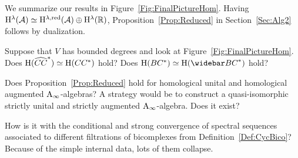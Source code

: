 \documentclass[\MainFolder/Text.tex]{subfiles}
\begin{document}
We summarize our results in Figure~\ref{Fig:FinalPictureHom}. Having $\mathrm{H}^\lambda(\mathcal{A}) \simeq \mathrm{H}^{\lambda,\mathrm{red}}(\mathcal{A}) \oplus \mathrm{H}^{\lambda}(\mathbb{R})$, Proposition~\ref{Prop:Reduced} in Section~\ref{Sec:Alg2} follows by dualization. 

\begin{Remark}\label{Rem:OpenProbAInftx}
\begin{RemarkList}
\item Suppose that $V$ has bounded degrees and look at Figure~\ref{Fig:FinalPictureHom}. Does $\mathrm{H}(\widehat{CC}^*)\simeq \mathrm{H}(CC^*)$ hold? Does $\H(\ConCycBi^*)\simeq\H(\NConCycBi^*)$ hold?
\item Does Proposition~\ref{Prop:Reduced} hold for homological unital and homological augmented $\mathrm{A}_\infty$-algebras? A strategy would be to construct a quasi-isomorphic strictly unital and strictly augmented $\mathrm{A}_\infty$-algebra. Does it exist?
\item How is it with the conditional and strong convergence of spectral sequences associated to different filtrations of bicomplexes from Definition~\ref{Def:CycBico}? Because of the simple internal data, lots of them collapse.\qedhere
\end{RemarkList}
\end{Remark}
\end{document}
